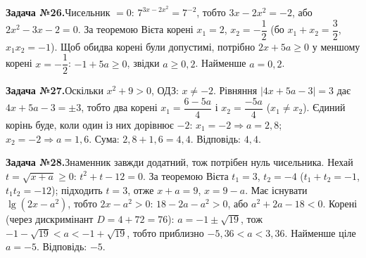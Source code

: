 \documentclass[12pt]{article}
\begin{document}
\par\vspace{0.3cm}\noindent\hypertarget{sol:26}{}
\begin{tcolorbox}[colback=titleBg!40, colframe=mainGreen!55, boxrule=0.4pt, arc=2pt, left=6pt, right=6pt, top=4pt, bottom=4pt, breakable]
\noindent\small\textbf{Задача №26.}\quad Чисельник $=0$: $7^{3x-2x^2}=7^{-2}$, тобто $3x-2x^2=-2$, або $2x^2-3x-2=0$. За теоремою Вієта корені $x_1=2$, $x_2=-\dfrac{1}{2}$ (бо $x_1+x_2=\dfrac{3}{2}$, $x_1x_2=-1$). Щоб обидва корені були допустимі, потрібно $2x+5a\geqslant0$ у меншому корені $x=-\dfrac{1}{2}$: $-1+5a\geqslant0$, звідки $a\geqslant0{,}2$. Найменше $a=0{,}2$.
\par\vspace{0.1cm}\hfill\hyperlink{task:26}{}
\end{tcolorbox}
\par\vspace{0.3cm}\noindent\hypertarget{sol:27}{}
\begin{tcolorbox}[colback=titleBg!40, colframe=mainGreen!55, boxrule=0.4pt, arc=2pt, left=6pt, right=6pt, top=4pt, bottom=4pt, breakable]
\noindent\small\textbf{Задача №27.}\quad Оскільки $x^2+9>0$, ОДЗ: $x\ne-2$. Рівняння $|4x+5a-3| = 3$ дає $4x+5a-3 = \pm3$, тобто два корені $x_1 = \dfrac{6-5a}{4}$ і $x_2 = \dfrac{-5a}{4}$ ($x_1\ne x_2$). Єдиний корінь буде, коли один із них дорівнює $-2$: $x_1=-2 \Rightarrow a=2{,}8$; $x_2=-2 \Rightarrow a=1{,}6$. Сума: $2{,}8+1{,}6 = 4{,}4$. Відповідь: \textbf{$4{,}4$}.
\par\vspace{0.1cm}\hfill\hyperlink{task:27}{}
\end{tcolorbox}
\par\vspace{0.3cm}\noindent\hypertarget{sol:28}{}
\begin{tcolorbox}[colback=titleBg!40, colframe=mainGreen!55, boxrule=0.4pt, arc=2pt, left=6pt, right=6pt, top=4pt, bottom=4pt, breakable]
\noindent\small\textbf{Задача №28.}\quad Знаменник завжди додатний, тож потрібен нуль чисельника. Нехай $t=\sqrt{x+a}\geqslant0$: $t^2+t-12=0$. За теоремою Вієта $t_1=3$, $t_2=-4$ ($t_1+t_2=-1$, $t_1t_2=-12$); підходить $t=3$, отже $x+a=9$, $x=9-a$. Має існувати $\lg(2x-a^2)$, тобто $2x-a^2>0$: $18-2a-a^2>0$, або $a^2+2a-18<0$. Корені (через дискримінант $D=4+72=76$): $a=-1\pm\sqrt{19}$, тож $-1-\sqrt{19}<a<-1+\sqrt{19}$, тобто приблизно $-5{,}36<a<3{,}36$. Найменше ціле $a=-5$. Відповідь: \textbf{$-5$}.
\par\vspace{0.1cm}\hfill\hyperlink{task:28}{}
\end{tcolorbox}
\end{document}

